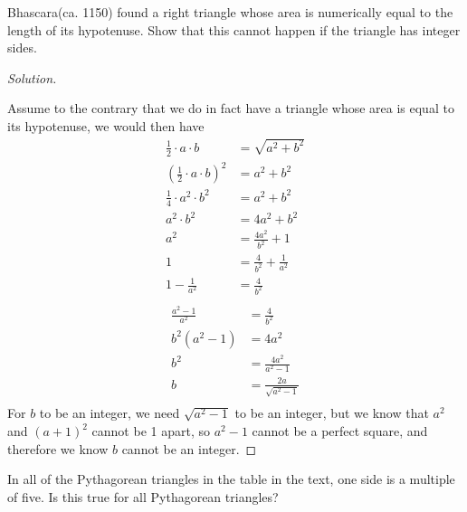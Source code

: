 \documentclass[11pt]{article}
\newenvironment{problem}[2][Problem]{\begin{trivlist}
\item[\hskip \labelsep {\bfseries #1}\hskip \labelsep {\bfseries #2.}]}{\end{trivlist}}
\newenvironment{solution}
  {\renewcommand\qedsymbol{$~$}\begin{proof}[Solution]$ $\par\nobreak\ignorespaces}
  {\end{proof}}
\begin{document}
\begin{problem}{8}
Bhascara(ca. 1150) found a right triangle whose area is numerically equal to the length of its hypotenuse. Show that this cannot happen if the triangle has integer sides.
\end{problem}

\begin{solution}
  Assume to the contrary that we do in fact have a triangle whose area is equal to its hypotenuse, we would then have
  \begin{align*}
    \frac{1}{2} \cdot a \cdot b               & = \sqrt{a^2 + b^2}              \\
    \left(\frac{1}{2}\cdot a \cdot b\right)^2 & = a^2 + b^2                     \\
    \frac{1}{4}\cdot a^2 \cdot b^2            & = a^2 + b^2                     \\
    a^2 \cdot b^2                             & = 4a^2 + b^2                    \\
    a^2                                       & = \frac{4a^2}{b^2} + 1          \\
    1                                         & = \frac{4}{b^2} + \frac{1}{a^2} \\
    1 - \frac{1}{a^2}                         & = \frac{4}{b^2}                 \\
  \end{align*}
  \begin{align*}
    \frac{a^2-1}{a^2} & = \frac{4}{b^2}           \\
    b^2(a^2-1)        & = 4a^2                    \\
    b^2               & = \frac{4a^2}{a^2-1}      \\
    b                 & = \frac{2a}{\sqrt{a^2-1}} \\
  \end{align*}
  For $b$ to be an integer, we need $\sqrt{a^2-1}$ to be an integer, but we know that $a^2$ and $(a+1)^2$ cannot be 1 apart, so $a^2-1$ cannot be a perfect square, and therefore we know $b$ cannot be an integer.
\end{solution}



\begin{problem}{9}
In all of the Pythagorean triangles in the table in the text, one side is a multiple of five. Is this true for all Pythagorean triangles?
\end{problem}
\end{document}
